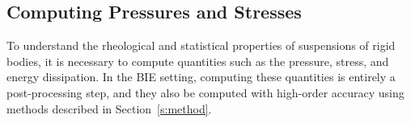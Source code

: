 \documentclass[preprint, 10pt]{elsarticle}
\begin{document}

\subsection{Computing Pressures and Stresses}
To understand the rheological and statistical properties of suspensions
of rigid bodies, it is necessary to compute quantities such as the
pressure, stress, and energy dissipation.  In the BIE setting, computing
these quantities is entirely a post-processing step, and they also be
computed with high-order accuracy using methods described in
Section~\ref{s:method}.
\end{document}
